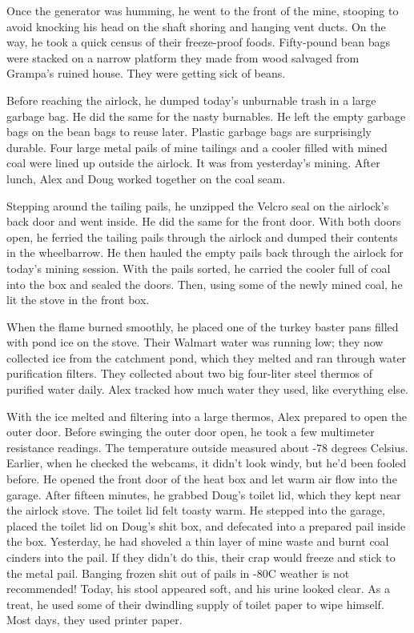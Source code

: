 Once the generator was humming, he went to the front of the mine,
stooping to avoid knocking his head on the shaft shoring and hanging
vent ducts. On the way, he took a quick census of their freeze-proof
foods. Fifty-pound bean bags were stacked on a narrow platform they made
from wood salvaged from Grampa's ruined house. They were getting sick of
beans.

Before reaching the airlock, he dumped today's unburnable trash in a
large garbage bag. He did the same for the nasty burnables. He left the
empty garbage bags on the bean bags to reuse later. Plastic garbage bags
are surprisingly durable. Four large metal pails of mine tailings and a
cooler filled with mined coal were lined up outside the airlock. It was
from yesterday's mining. After lunch, Alex and Doug worked together on
the coal seam.

Stepping around the tailing pails, he unzipped the Velcro seal on the
airlock's back door and went inside. He did the same for the front door.
With both doors open, he ferried the tailing pails through the airlock
and dumped their contents in the wheelbarrow. He then hauled the empty
pails back through the airlock for today's mining session. With the
pails sorted, he carried the cooler full of coal into the box and sealed
the doors. Then, using some of the newly mined coal, he lit the stove in
the front box.

When the flame burned smoothly, he placed one of the turkey baster pans
filled with pond ice on the stove. Their Walmart water was running low;
they now collected ice from the catchment pond, which they melted and
ran through water purification filters. They collected about two big
four-liter steel thermos of purified water daily. Alex tracked how much
water they used, like everything else.

With the ice melted and filtering into a large thermos, Alex prepared to
open the outer door. Before swinging the outer door open, he took a few
multimeter resistance readings. The temperature outside measured about
-78 degrees Celsius. Earlier, when he checked the webcams, it didn't
look windy, but he'd been fooled before. He opened the front door of the
heat box and let warm air flow into the garage. After fifteen minutes,
he grabbed Doug's toilet lid, which they kept near the airlock stove.
The toilet lid felt toasty warm. He stepped into the garage, placed the
toilet lid on Doug's shit box, and defecated into a prepared pail inside
the box. Yesterday, he had shoveled a thin layer of mine waste and burnt
coal cinders into the pail. If they didn't do this, their crap would
freeze and stick to the metal pail. Banging frozen shit out of pails in
-80C weather is not recommended! Today, his stool appeared soft, and his
urine looked clear. As a treat, he used some of their dwindling supply
of toilet paper to wipe himself. Most days, they used printer paper.

